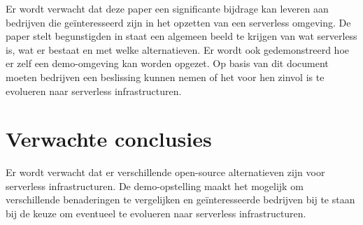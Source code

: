 Er wordt verwacht dat deze paper een significante bijdrage kan leveren aan bedrijven die geïnteresseerd zijn in het opzetten van een serverless omgeving. De paper stelt begunstigden in staat een algemeen beeld te krijgen van wat serverless is, wat er bestaat en met welke alternatieven. Er wordt ook gedemonstreerd hoe er zelf een demo-omgeving kan worden opgezet. Op basis van dit document moeten bedrijven een beslissing kunnen nemen of het voor hen zinvol is te evolueren naar serverless infrastructuren.


\section{Verwachte conclusies}
\label{sec:verwachte_conclusies}

Er wordt verwacht dat er verschillende open-source alternatieven zijn voor serverless infrastructuren. De demo-opstelling maakt het mogelijk om verschillende benaderingen te vergelijken en geïnteresseerde bedrijven bij te staan bij de keuze om eventueel te evolueren naar serverless infrastructuren.
